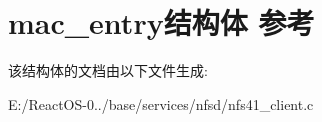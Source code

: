 \hypertarget{structmac__entry}{}\section{mac\+\_\+entry结构体 参考}
\label{structmac__entry}


该结构体的文档由以下文件生成\+:\begin{DoxyCompactItemize}
\item 
E\+:/\+React\+O\+S-\/0../base/services/nfsd/nfs41\+\_\+client.\+c\end{DoxyCompactItemize}
